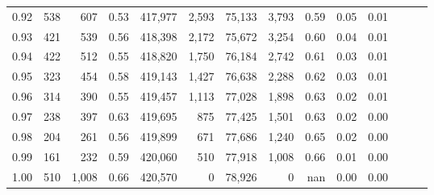 \begin{tabular}{rrrrrrrrrrrrrr}
0.92 &    538 &    607 &  0.53 &  417,977 &    2,593 &  75,133 &   3,793 &  0.59 &  0.05 &      0.01 \\
0.93 &    421 &    539 &  0.56 &  418,398 &    2,172 &  75,672 &   3,254 &  0.60 &  0.04 &      0.01 \\
0.94 &    422 &    512 &  0.55 &  418,820 &    1,750 &  76,184 &   2,742 &  0.61 &  0.03 &      0.01 \\
0.95 &    323 &    454 &  0.58 &  419,143 &    1,427 &  76,638 &   2,288 &  0.62 &  0.03 &      0.01 \\
0.96 &    314 &    390 &  0.55 &  419,457 &    1,113 &  77,028 &   1,898 &  0.63 &  0.02 &      0.01 \\
0.97 &    238 &    397 &  0.63 &  419,695 &      875 &  77,425 &   1,501 &  0.63 &  0.02 &      0.00 \\
0.98 &    204 &    261 &  0.56 &  419,899 &      671 &  77,686 &   1,240 &  0.65 &  0.02 &      0.00 \\
0.99 &    161 &    232 &  0.59 &  420,060 &      510 &  77,918 &   1,008 &  0.66 &  0.01 &      0.00 \\
1.00 &    510 &  1,008 &  0.66 &  420,570 &        0 &  78,926 &       0 &   nan &  0.00 &      0.00 \\
\bottomrule
\end{tabular}
